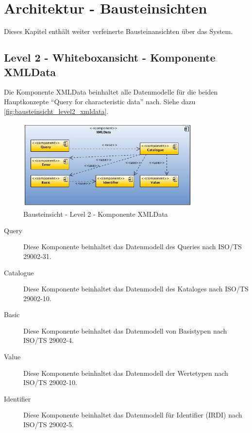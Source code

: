 \chapter{Architektur - Bausteinsichten} \label{kap:anh_architektur}

Dieses Kapitel enthält weiter verfeinerte Bausteinansichten über das System.

\section{Level 2 - Whiteboxansicht - Komponente XMLData}

Die Komponente XMLData beinhaltet alle Datenmodelle für die beiden Hauptkonzepte \enquote{Query for characteristic data} nach. Siehe dazu \autoref{fig:bausteinsicht_level2_xmldata}. 

\begin{figure}[htbp]
	\centering
		\includegraphics[width=0.82\textwidth]{images/bausteinsicht_plib_level2_xmldata.jpg}
	\caption{Bausteinsicht - Level 2 - Komponente XMLData}
	\label{fig:bausteinsicht_level2_xmldata}
\end{figure}

\begin{description}
\item[Query] Diese Komponente beinhaltet das Datenmodell des Queries nach ISO/TS 29002-31. 
\item[Catalogue] Diese Komponente beinhaltet das Datenmodell des Kataloges nach ISO/TS 29002-10. 
\item[Basic] Diese Komponente beinhaltet das Datenmodell von Basistypen nach ISO/TS 29002-4.
\item[Value] Diese Komponente beinhaltet das Datenmodell der Wertetypen nach ISO/TS 29002-10.
\item[Identifier] Diese Komponente beinhaltet das Datenmodell für Identifier (IRDI) nach ISO/TS 29002-5. 
\end{description}

